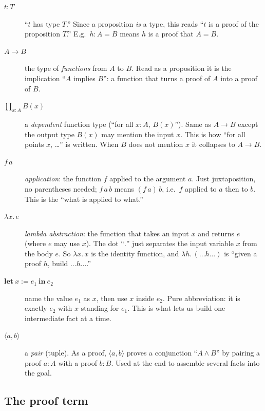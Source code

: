 \documentclass{article}
\providecommand{\coloneqq}{\mathrel{:=}}
\begin{document}
\begin{description}
  \item[$t : T$] ``$t$ has type $T$.'' Since a proposition \emph{is} a type,
    this reads ``$t$ is a proof of the proposition $T$.'' E.g.\ $h : A = B$ means
    $h$ is a proof that $A=B$.
  \item[$A \to B$] the type of \emph{functions} from $A$ to $B$. Read as a
    proposition it is the implication ``$A$ implies $B$'': a function that turns a
    proof of $A$ into a proof of $B$.
  \item[$\displaystyle\prod_{x : A} B(x)$] a \emph{dependent} function type
    (``for all $x : A$, $B(x)$''). Same as $A \to B$ except the output type
    $B(x)$ may mention the input $x$. This is how ``for all points $x$, \dots''
    is written. When $B$ does not mention $x$ it collapses to $A \to B$.
  \item[$f\, a$] \emph{application}: the function $f$ applied to the argument $a$.
    Just juxtaposition, no parentheses needed; $f\,a\,b$ means $(f\,a)\,b$, i.e.\
    $f$ applied to $a$ then to $b$. This is the ``what is applied to what.''
  \item[$\lambda x.\, e$] \emph{lambda abstraction}: the function that takes an
    input $x$ and returns $e$ (where $e$ may use $x$). The dot ``$.$'' just
    separates the input variable $x$ from the body $e$. So
    $\lambda x.\, x$ is the identity function, and $\lambda h.\, (\dots h \dots)$
    is ``given a proof $h$, build $\dots h \dots$.''
  \item[$\mathbf{let}\ x \coloneqq e_1\ \mathbf{in}\ e_2$] name the value $e_1$ as
    $x$, then use $x$ inside $e_2$. Pure abbreviation: it is exactly $e_2$ with
    $x$ standing for $e_1$. This is what lets us build one intermediate fact at a
    time.
  \item[$\langle a, b \rangle$] a \emph{pair} (tuple). As a proof, $\langle a,b\rangle$
    proves a conjunction ``$A \wedge B$'' by pairing a proof $a : A$ with a proof
    $b : B$. Used at the end to assemble several facts into the goal.
\end{description}

\subsection*{The proof term}
\end{document}
